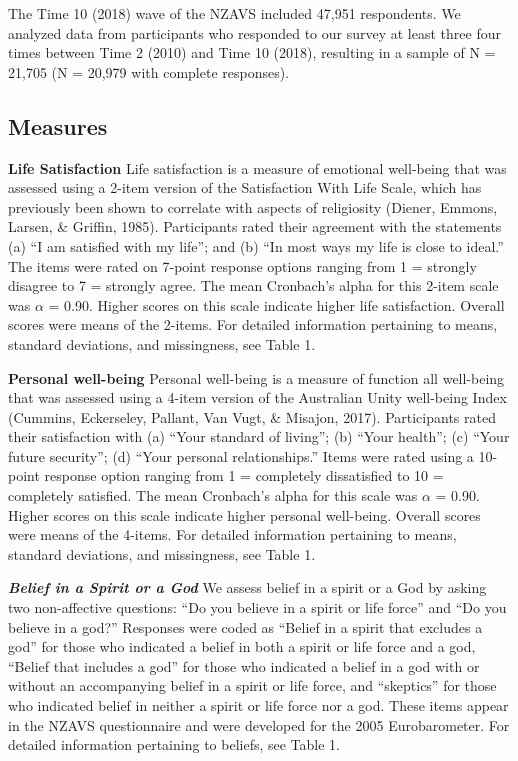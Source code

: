 \documentclass[
  english,
  man]{apa6}
\begin{document}
The Time 10 (2018) wave of the NZAVS included 47,951 respondents. We analyzed data from participants who responded to our survey at least three four times between Time 2 (2010) and Time 10 (2018), resulting in a sample of N = 21,705 (N = 20,979 with complete responses).

\hypertarget{measures}{%
\subsection{Measures}\label{measures}}

\textbf{Life Satisfaction} Life satisfaction is a measure of emotional well-being that was assessed using a 2-item version of the Satisfaction With Life Scale, which has previously been shown to correlate with aspects of religiosity (Diener, Emmons, Larsen, \& Griffin, 1985). Participants rated their agreement with the statements (a) \enquote{I am satisfied with my life}; and (b) \enquote{In most ways my life is close to ideal.} The items were rated on 7-point response options ranging from 1 = strongly disagree to 7 = strongly agree. The mean Cronbach's alpha for this 2-item scale was \(\alpha\) = 0.90. Higher scores on this scale indicate higher life satisfaction. Overall scores were means of the 2-items. For detailed information pertaining to means, standard deviations, and missingness, see Table 1.

\textbf{Personal well-being} Personal well-being is a measure of function all well-being that was assessed using a 4-item version of the Australian Unity well-being Index (Cummins, Eckerseley, Pallant, Van Vugt, \& Misajon, 2017). Participants rated their satisfaction with (a) \enquote{Your standard of living}; (b) \enquote{Your health}; (c) \enquote{Your future security}; (d) \enquote{Your personal relationships.} Items were rated using a 10-point response option ranging from 1 = completely dissatisfied to 10 = completely satisfied. The mean Cronbach's alpha for this scale was \(\alpha\) = 0.90. Higher scores on this scale indicate higher personal well-being. Overall scores were means of the 4-items. For detailed information pertaining to means, standard deviations, and missingness, see Table 1.

\textbf{\emph{Belief in a Spirit or a God}} We assess belief in a spirit or a God by asking two non-affective questions: \enquote{Do you believe in a spirit or life force} and \enquote{Do you believe in a god?} Responses were coded as \enquote{Belief in a spirit that excludes a god} for those who indicated a belief in both a spirit or life force and a god, \enquote{Belief that includes a god} for those who indicated a belief in a god with or without an accompanying belief in a spirit or life force, and \enquote{skeptics} for those who indicated belief in neither a spirit or life force nor a god. These items appear in the NZAVS questionnaire and were developed for the 2005 Eurobarometer. For detailed information pertaining to beliefs, see Table 1.
\end{document}
